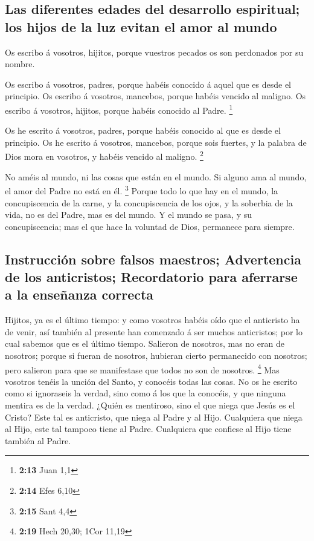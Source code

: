 \hypertarget{las-diferentes-edades-del-desarrollo-espiritual-los-hijos-de-la-luz-evitan-el-amor-al-mundo}{%
\subsection{Las diferentes edades del desarrollo espiritual; los hijos
de la luz evitan el amor al
mundo}\label{las-diferentes-edades-del-desarrollo-espiritual-los-hijos-de-la-luz-evitan-el-amor-al-mundo}}

 Os escribo á vosotros, hijitos, porque vuestros pecados os
son perdonados por su nombre.

 Os escribo á vosotros, padres, porque habéis conocido á
aquel que es desde el principio. Os escribo á vosotros, mancebos, porque
habéis vencido al maligno. Os escribo á vosotros, hijitos, porque habéis
conocido al Padre. \footnote{\textbf{2:13} Juan 1,1}

 Os he escrito á vosotros, padres, porque habéis conocido
al que es desde el principio. Os he escrito á vosotros, mancebos, porque
sois fuertes, y la palabra de Dios mora en vosotros, y habéis vencido al
maligno. \footnote{\textbf{2:14} Efes 6,10}

 No améis al mundo, ni las cosas que están en el mundo. Si
alguno ama al mundo, el amor del Padre no está en él. \footnote{\textbf{2:15}
  Sant 4,4}  Porque todo lo que hay en el mundo, la
concupiscencia de la carne, y la concupiscencia de los ojos, y la
soberbia de la vida, no es del Padre, mas es del mundo.  Y
el mundo se pasa, y su concupiscencia; mas el que hace la voluntad de
Dios, permanece para siempre.

\hypertarget{instrucciuxf3n-sobre-falsos-maestros-advertencia-de-los-anticristos-recordatorio-para-aferrarse-a-la-enseuxf1anza-correcta}{%
\subsection{Instrucción sobre falsos maestros; Advertencia de los
anticristos; Recordatorio para aferrarse a la enseñanza
correcta}\label{instrucciuxf3n-sobre-falsos-maestros-advertencia-de-los-anticristos-recordatorio-para-aferrarse-a-la-enseuxf1anza-correcta}}

 Hijitos, ya es el último tiempo: y como vosotros habéis
oído que el anticristo ha de venir, así también al presente han
comenzado á ser muchos anticristos; por lo cual sabemos que es el último
tiempo.  Salieron de nosotros, mas no eran de nosotros;
porque si fueran de nosotros, hubieran cierto permanecido con nosotros;
pero salieron para que se manifestase que todos no son de nosotros.
\footnote{\textbf{2:19} Hech 20,30; 1Cor 11,19}  Mas
vosotros tenéis la unción del Santo, y conocéis todas las cosas.
 No os he escrito como si ignoraseis la verdad, sino como á
los que la conocéis, y que ninguna mentira es de la verdad.
 ¿Quién es mentiroso, sino el que niega que Jesús es el
Cristo? Este tal es anticristo, que niega al Padre y al Hijo.
 Cualquiera que niega al Hijo, este tal tampoco tiene al
Padre. Cualquiera que confiese al Hijo tiene también al Padre.

